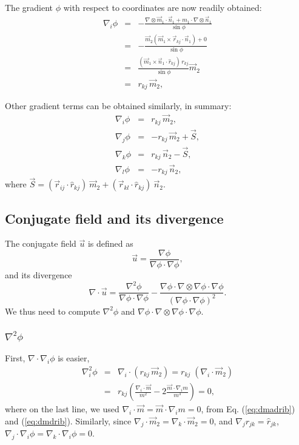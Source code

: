 \documentclass{article}
\begin{document}
The gradient $\phi$ with respect to coordinates are now readily obtained:
\begin{eqnarray*}
\nabla_i \phi &=& -\frac{ \nabla \otimes \vec m_1 \cdot \vec n_1  + m_1 \cdot \nabla \otimes \vec n_1 }
                  {\sin \phi} \\
              &=& -\frac{ \vec m_2 (\vec m_1 \times \vec r_{kj} \cdot \vec n_1) + 0 }
                  {\sin \phi} \\
              &=& \frac{ (\vec m_1 \times \vec n_1 \cdot \hat r_{kj}) \, r_{kj} }
                  {\sin \phi} \vec m_2 \\
              &=& r_{kj} \, \vec m_2,
\end{eqnarray*}

Other gradient terms can be obtained similarly, in summary:
\begin{eqnarray}
\nabla_i \phi   &=&  r_{kj} \, \vec m_2, \\
\nabla_j \phi   &=& -r_{kj} \, \vec m_2 + \vec S, \\
\nabla_k \phi   &=&  r_{kj} \, \vec n_2 - \vec S, \\
\nabla_l \phi   &=& -r_{kj} \, \vec n_2,
\end{eqnarray}
where
$\vec S = (\vec r_{ij} \cdot \hat r_{kj}) \ \vec m_2 
        + (\vec r_{kl} \cdot \hat r_{kj}) \ \vec n_2.$



\subsection{Conjugate field and its divergence}


The conjugate field $\vec u$ is defined as
\begin{equation}
\vec u = \frac {\nabla \phi} {\nabla \phi \cdot \nabla \phi},
\end{equation}
and its divergence
\begin{equation}
\nabla \cdot \vec u  = 
   \frac {\nabla^2 \phi} 
         {\nabla \phi \cdot \nabla \phi}
 - \frac {\nabla \phi \cdot \nabla \otimes \nabla \phi \cdot \nabla \phi} 
         {(\nabla \phi \cdot \nabla \phi)^2}.
\end{equation}
%
We thus need to compute 
$\nabla^2 \phi$
and
$\nabla \phi \cdot \nabla \otimes \nabla \phi \cdot \nabla \phi$.


\subsubsection{$\nabla^2 \phi$}
First, $\nabla \cdot \nabla_i \phi$ is easier,
%
\begin{eqnarray*}
\nabla_i^2 \phi   
&=& \nabla_i \cdot (r_{kj} \, \vec m_2) 
 =  r_{kj} \; ( \nabla_i \cdot \vec m_2 ) \\
&=& r_{kj} 
  \left(
    \frac {\nabla_i \cdot \vec m} {m^2} 
    - 2 \frac {\vec m \cdot \nabla_i m} {m^3}
  \right) = 0,
\end{eqnarray*}
where on the last line, we used
$\nabla_i \cdot \vec m = \vec m \cdot \nabla_i m = 0$,
from Eq. (\ref{eq:dmadrib}) and (\ref{eq:dmdrib}).
%
Similarly, since
$\nabla_j \cdot \vec m_2 = \nabla_k \cdot \vec m_2 = 0$,
and
$\nabla_j r_{jk} = \hat r_{jk}$,
%
$\nabla_j \cdot \nabla_i \phi = \nabla_k \cdot \nabla_i \phi = 0$.
\end{document}
